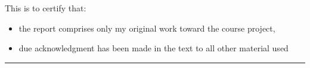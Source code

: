 \thispagestyle{plain}

This is to certify that:
\begin{itemize}
\item[(i)] the report comprises only my original work toward the course project,
\item[(ii)] due acknowledgment has been made in the text to all other material used
\end{itemize}

\vspace{2cm}
\begin{flushright}
\rule[0mm]{6cm}{0.2mm}\\
\TeamNumber\\
\submissionDate\\
\end{flushright}
\clearpage